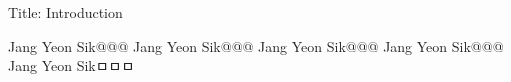 Title: Introduction


Jang Yeon Sik@@@
Jang Yeon Sik@@@
Jang Yeon Sik@@@
Jang Yeon Sik@@@
Jang Yeon Sikㅁㅁㅁ
